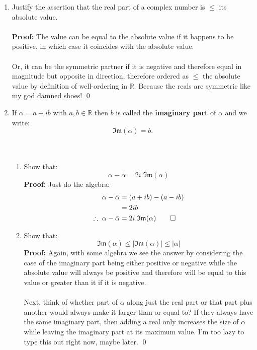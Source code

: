 \begin{enumerate}
	\item Justify the assertion that the real part of a complex number is $\leq$ its absolute value.
	\\
	\\
	\textbf{Proof:}
	The value can be equal to the absolute value if it happens to be positive, in which case it coincides with the absolute value. \\
	\\
	Or, it can be the symmetric partner if it is negative and therefore equal in magnitude but opposite in direction, therefore ordered as $\le$ the absolute value by definition of well-ordering in $\mathbb{R}$. Because the reals are symmetric like my god damned shoes! \qed
	
	\item If $\alpha = a + ib$ with $a, b \in \mathbb{R}$ then $b$ is called the \textbf{imaginary part} of $\alpha$ and we write: 
	$$\mathfrak{Im}(\alpha) = b.$$ \\
	\\
	\begin{enumerate}
		\item Show that: 
		$$\alpha - \bar{\alpha} = 2i \; \mathfrak{Im}(\alpha)$$
		\textbf{Proof:}
		Just do the algebra:
		\begin{align*}
			\alpha - \bar{\alpha} &= (a + ib) - (a - ib) \\
			&= 2ib \\
			\therefore \; \alpha - \bar{\alpha} &= 2i \; \mathfrak{Im}(\alpha) \qed
		\end{align*}
		\item Show that:
		$$\mathfrak{Im}(\alpha) \leq \left | \mathfrak{Im}(\alpha) \right | \leq |\alpha|$$
		\textbf{Proof:} Again, with some algebra we see the answer by considering the case of the imaginary part being either positive or negative while the absolute value will always be positive and therefore will be equal to this value or greater than it if it is negative. \\
		\\
		Next, think of whether part of $\alpha$ along just the real part or that part plus another would always make it larger than or equal to? If they always have the same imaginary part, then adding a real only increases the size of $\alpha$ while leaving the imaginary part at its maximum value. I'm too lazy to type this out right now, maybe later. \qed
	\end{enumerate}
	

\end{enumerate}
